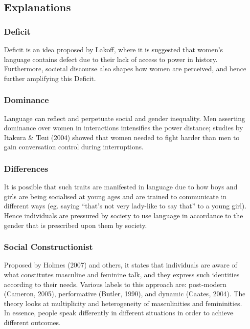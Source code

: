 \documentclass[../main.tex]{subfiles}
\begin{document}
        \subsection{Explanations}
            \subsubsection{Deficit}
            Deficit is an idea proposed by Lakoff, where it is suggested that women's language contains defect due to their lack of access to power in history. Furthermore, societal discourse also shapes how women are perceived, and hence further amplifying this Deficit. 

            \subsubsection{Dominance}
            Language can reflect and perpetuate social and gender inequality. Men asserting dominance over women in interactions intensifies the power distance; studies by Itakura \& Tsui (2004) showed that women needed to fight harder than men to gain conversation control during interruptions.

            \subsubsection{Differences}
            It is possible that such traits are manifested in language due to how boys and girls are being socialised at young ages and are trained to communicate in different ways (eg. saying ``that's not very lady-like to say that'' to a young girl). Hence individuals are pressured by society to use language in accordance to the gender that is prescribed upon them by society. 

            \subsubsection{Social Constructionist}
            Proposed by Holmes (2007) and others, it states that individuals are aware of what constitutes masculine and feminine talk, and they express such identities according to their needs. Various labels to this approach are: post-modern (Cameron, 2005), performative (Butler, 1990), and dynamic (Caates, 2004). The theory looks at multiplicity and heterogeneity of masculinities and femininities. In essence, people speak differently in different situations in order to achieve different outcomes.
            
\end{document}
